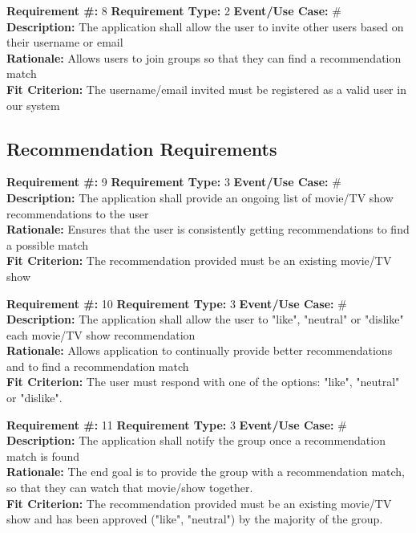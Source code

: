 \documentclass[12pt]{article}
\begin{document}
\bigskip
\textbf{Requirement \#:} 8 \quad \textbf{Requirement Type:} 2 \quad \textbf{Event/Use Case:} \#
\medskip
\\\textbf{Description:} The application shall allow the user to invite other users based on their username or email
\\\textbf{Rationale:} Allows users to join groups so that they can find a recommendation match
\\\textbf{Fit Criterion:} The username/email invited must be registered as a valid user in our system 

\subsection{Recommendation Requirements} 
\noindent

\textbf{Requirement \#:} 9 \quad \textbf{Requirement Type:} 3 \quad \textbf{Event/Use Case:} \#
\medskip
\\\textbf{Description:} The application shall provide an ongoing list of movie/TV show recommendations to the user
\\\textbf{Rationale:} Ensures that the user is consistently getting recommendations to find a possible match
\\\textbf{Fit Criterion:} The recommendation provided must be an existing movie/TV show

\bigskip
\textbf{Requirement \#:} 10 \quad \textbf{Requirement Type:} 3 \quad \textbf{Event/Use Case:} \#
\medskip
\\\textbf{Description:} The application shall allow the user to "like", "neutral" or "dislike" each movie/TV show recommendation
\\\textbf{Rationale:} Allows application to continually provide better recommendations and to find a recommendation match
\\\textbf{Fit Criterion:} The user must respond with one of the options: "like", "neutral" or "dislike".

\bigskip
\textbf{Requirement \#:} 11 \quad \textbf{Requirement Type:} 3 \quad \textbf{Event/Use Case:} \#
\medskip
\\\textbf{Description:} The application shall notify the group once a recommendation match is found
\\\textbf{Rationale:} The end goal is to provide the group with a recommendation match, so that they can watch that movie/show together.
\\\textbf{Fit Criterion:} The recommendation provided must be an existing movie/TV show and has been approved ("like", "neutral") by the majority of the group. 
\end{document}
